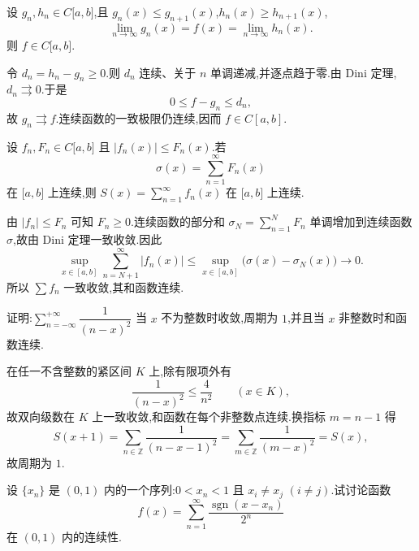 \begin{example}
    设 $g_n,h_n\in C\lbrack a,b\rbrack$,且 $g_n(x)\leq g_{n+1}(x)$,$h_n(x)\geq h_{n+1}(x)$,
    \[
        \lim\limits_{n\to\infty}g_n(x)=f(x)=\lim\limits_{n\to\infty}h_n(x).
    \]
    则 $f\in C\lbrack a,b\rbrack$.
\end{example}
\exampleblank

\begin{solution}
    令 $d_n=h_n-g_n\geq0$.则 $d_n$ 连续、关于 $n$ 单调递减,并逐点趋于零.由 Dini 定理,$d_n\rightrightarrows0$.于是
    \[
        0\leq f-g_n\leq d_n,
    \]
    故 $g_n\rightrightarrows f$.连续函数的一致极限仍连续,因而 $f\in C[a,b]$.
\end{solution}

\begin{example}
    设 $f_n,F_n\in C\lbrack a,b\rbrack$ 且 $|f_n(x)|\leq F_n(x)$.若
    \[
        \sigma(x)=\sum\limits_{n=1}^{\infty}F_n(x)
    \]
    在 $\lbrack a,b\rbrack$ 上连续,则 $S(x)=\displaystyle\sum\limits_{n=1}^{\infty}f_n(x)$ 在 $\lbrack a,b\rbrack$ 上连续.
\end{example}
\exampleblank

\begin{solution}
    由 $|f_n|\leq F_n$ 可知 $F_n\geq0$.连续函数的部分和
    $\sigma_N=\sum_{n=1}^{N}F_n$ 单调增加到连续函数 $\sigma$,故由 Dini 定理一致收敛.因此
    \[
        \sup_{x\in[a,b]}\sum\limits_{n=N+1}^{\infty}|f_n(x)|
        \leq\sup_{x\in[a,b]}\bigl(\sigma(x)-\sigma_N(x)\bigr)\longrightarrow0.
    \]
    所以 $\sum f_n$ 一致收敛,其和函数连续.
\end{solution}

\begin{example}
    证明:$\displaystyle\sum\limits_{n=-\infty}^{+\infty}\dfrac{1}{(n-x)^2}$ 当 $x$ 不为整数时收敛,周期为 $1$,并且当 $x$ 非整数时和函数连续.
\end{example}
\exampleblank

\begin{solution}
    在任一不含整数的紧区间 $K$ 上,除有限项外有
    \[
        \dfrac{1}{(n-x)^2}\leq\dfrac{4}{n^2}\qquad(x\in K),
    \]
    故双向级数在 $K$ 上一致收敛,和函数在每个非整数点连续.换指标
    $m=n-1$ 得
    \[
        S(x+1)=\sum\limits_{n\in\mathbb Z}\dfrac{1}{(n-x-1)^2}
        =\sum\limits_{m\in\mathbb Z}\dfrac{1}{(m-x)^2}=S(x),
    \]
    故周期为 $1$.
\end{solution}

\begin{example}[\markstar]
    设 $\{x_n\}$ 是 $(0,1)$ 内的一个序列:$0<x_n<1$ 且 $x_i\neq x_j$ $(i\neq j)$.试讨论函数
    \[
        f(x)=\sum\limits_{n=1}^{\infty}\dfrac{\operatorname{sgn}(x-x_n)}{2^n}
    \]
    在 $(0,1)$ 内的连续性.
\end{example}
\exampleblank

